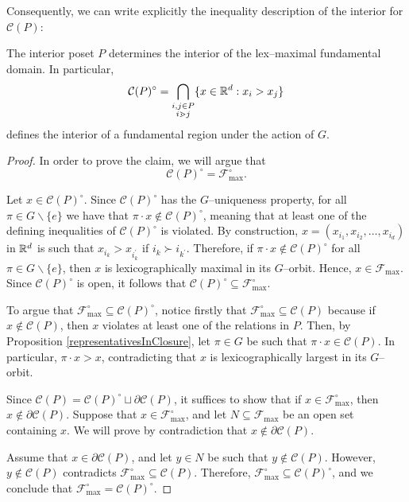 Consequently, we can write explicitly the inequality description of the interior for $\mathcal{C}(P)$:

\begin{thm}\label{kEqualsTwoIsLexMax}
The interior poset $P$ determines the interior of the lex--maximal fundamental domain. In particular, \[ \mathcal{C}(P)^\circ =  \bigcap_{\substack{i,j \in P  \\ i \gtrdot j}} \{ x\in\mathbb{R}^d : x_i > x_j \} \] defines the interior of a fundamental region under the action of $G$.
\end{thm}

\begin{proof}
In order to prove the claim, we will argue that \[\mathcal{C}(P)^\circ = \mathcal{F}_{\max}^\circ.\]

Let $x \in \mathcal{C}(P)^\circ$. Since $\mathcal{C}(P)^\circ$ has the $G$--uniqueness property, for all $\pi \in G\backslash\{e\}$ we have that $\pi \cdot x \notin \mathcal{C}(P)^\circ$, meaning that at least one of the defining inequalities of $\mathcal{C}(P)^\circ$ is violated. By construction, $x = (x_{i_1}, x_{i_2}, \dots , x_{i_d})$ in $\mathbb{R}^d$ is such that $x_{i_k} > x_{i_k^\prime}$ if $i_k \succ i_{k^\prime}$. Therefore, if $\pi \cdot x \notin \mathcal{C}(P)^\circ$ for all $\pi \in G\backslash \{e\}$, then $x$ is lexicographically maximal in its $G$--orbit. Hence, $x \in \mathcal{F}_{\max}$. Since $\mathcal{C}(P)^\circ$ is open, it follows that $\mathcal{C}(P)^\circ \subseteq \mathcal{F}_{\max}^\circ$.

To argue that $\mathcal{F}_{\max}^\circ \subseteq \mathcal{C}(P)^\circ$, notice firstly that $\mathcal{F}_{\max}^\circ \subseteq \mathcal{C}(P)$ because if $x \notin \mathcal{C}(P)$, then $x$ violates at least one of the relations in $P$. Then, by Proposition \ref{representativesInClosure}, let $\pi \in G$ be such that $\pi \cdot x \in \mathcal{C}(P)$. In particular, $\pi \cdot x > x$, contradicting that $x$ is lexicographically largest in its $G$--orbit.

Since $\mathcal{C}(P) = \mathcal{C}(P)^\circ \sqcup \partial\mathcal{C}(P)$, it suffices to show that if $x \in \mathcal{F}_{\max}^\circ$, then $x\notin\partial\mathcal{C}(P)$. Suppose that $x \in \mathcal{F}_{\max}^\circ$, and let $N \subseteq \mathcal{F}_{\max}$ be an open set containing $x$. We will prove by contradiction that $x \notin \partial\mathcal{C}(P)$.

Assume that $x \in \partial\mathcal{C}(P)$, and let $y \in N$ be such that $y \notin \mathcal{C}(P)$. However, $y\notin\mathcal{C}(P)$ contradicts $\mathcal{F}_{\max}^\circ \subseteq \mathcal{C}(P)$. Therefore, $\mathcal{F}_{\max}^\circ \subseteq \mathcal{C}(P)^\circ$, and we conclude that $\mathcal{F}_{\max}^\circ = \mathcal{C}(P)^\circ$.
\end{proof} 